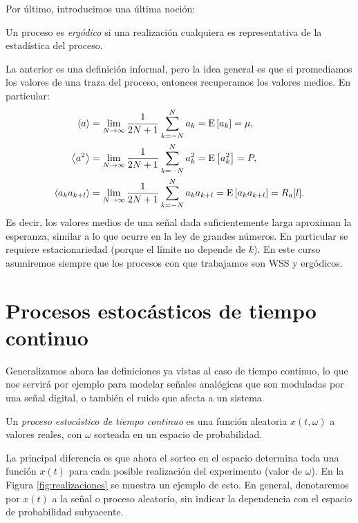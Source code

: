 Por último, introducimos una última noción:
\begin{definicion}
    Un proceso es \emph{ergódico} si una realización cualquiera es representativa de la estadística del proceso.
\end{definicion}

La anterior es una definición informal, pero la idea general es que si promediamos los valores de una traza del proceso, entonces recuperamos los valores medios. En particular:
\begin{align*}
    \left\langle a \right\rangle  &= \lim_{N\to\infty} \frac{1}{2N+1}\sum_{k=-N}^N a_k = \mathrm{E}\left[a_k\right] = \mu, \\
    \left\langle a^2 \right\rangle &= \lim_{N\to\infty} \frac{1}{2N+1}\sum_{k=-N}^N a_k^2 = \mathrm{E}\left[a_k^2\right] = P, \\
    \left\langle a_k a_{k+l}\right\rangle &= \lim_{N\to\infty} \frac{1}{2N+1}\sum_{k=-N}^N a_k a_{k+l} = \mathrm{E}\left[a_k a_{k+l}\right] = R_a[l].
\end{align*}
Es decir, los valores medios de una señal dada suficientemente larga aproximan la esperanza, similar a lo que ocurre en la ley de grandes números. En particular se requiere estacionariedad (porque el límite no depende de $k$). En este curso asumiremos siempre que los procesos con que trabajamos son WSS y ergódicos.

\section{Procesos estocásticos de tiempo continuo}\label{sec:procesos tc}

Generalizamos ahora las definiciones ya vistas al caso de tiempo continuo, lo que nos servirá por ejemplo para modelar señales analógicas que son moduladas por una señal digital, o también el ruido que afecta a un sistema.

\begin{definicion}\label{def:proceso_tc}
    Un \emph{proceso estocástico de tiempo continuo} es una función aleatoria $x(t,\omega)$ a valores reales, con $\omega$ sorteada en un espacio de probabilidad.
\end{definicion}

La principal diferencia es que ahora el sorteo en el espacio determina toda una función $x(t)$ para cada posible realización del experimento (valor de $\omega$). En la Figura \ref{fig:realizaciones} se muestra un ejemplo de esto. En general, denotaremos por $x(t)$ a la señal o proceso aleatorio, sin indicar la dependencia con el espacio de probabilidad subyacente.

